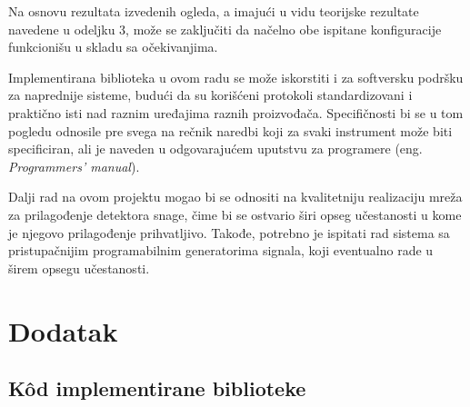 \documentclass[a4paper, 12pt, diplomski]{etf}
\begin{document}
Na osnovu rezultata izvedenih ogleda, a imajući u vidu 
teorijske rezultate navedene u odeljku 3, može se zaključiti
da načelno obe ispitane konfiguracije funkcionišu u skladu
sa očekivanjima.

Implementirana biblioteka u ovom radu se može iskorstiti 
i za softversku podršku za naprednije sisteme, budući 
da su korišćeni protokoli standardizovani i praktično 
isti nad raznim uređajima raznih proizvođača. Specifičnosti 
bi se u tom pogledu odnosile pre svega na rečnik 
naredbi koji za svaki instrument može biti
specificiran, ali je naveden u odgovarajućem 
uputstvu za programere (eng. \textit{Programmers' manual}). 

Dalji rad na ovom projektu mogao bi se odnositi
na kvalitetniju realizaciju mreža za prilagođenje
detektora snage, čime bi se ostvario 
širi opseg učestanosti u kome je njegovo 
prilagođenje prihvatljivo. Takođe, potrebno 
je ispitati rad sistema sa pristupačnijim
programabilnim generatorima signala, koji 
eventualno rade u širem opsegu učestanosti.



\newpage
\appendix
\chapter*{Dodatak}

\section{K\^od implementirane biblioteke \label{ap:lib}}

\end{document}
